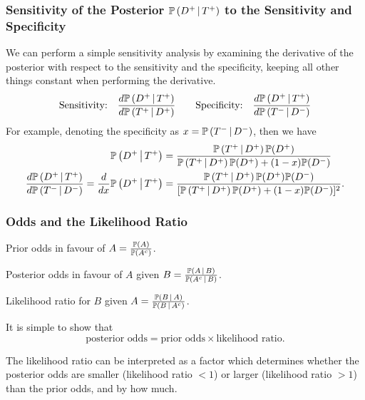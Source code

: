 \documentclass[10pt, a4paper]{article}
\begin{document}
\subsubsection{Sensitivity of the Posterior \texorpdfstring{$\P\left(D ^ {+} \mmid T ^ {+}\right)$}{} to the Sensitivity and Specificity}

We can perform a simple sensitivity analysis by examining the derivative of the posterior with respect to the sensitivity and the specificity,
keeping all other things constant when performing the derivative.
\[
\text{Sensitivity:}\quad\frac{d\P\left(D ^ {+} \mmid T ^ {+}\right)}{d\P\left(T ^ {+} \mmid D ^ {+}\right)}\qquad\text{Specificity:}\quad\frac{d\P\left(D ^ {+} \mmid T ^ {+}\right)}{d\P\left(T ^ {-} \mmid D ^ {-}\right)}
\]
For example,
denoting the specificity as $x = \P\left(T ^ {-} \mmid D ^ {-}\right)$,
then we have
\begin{align*}
    \P\left(D ^ {+} \mmid T ^ {+}\right) &= \frac{\cP{T ^ {+}}{D ^ {+}}\P(D ^ {+})}{\cP{T ^ {+}}{D ^ {+}}\P(D ^ {+}) + (1 - x)\P(D ^ {-})} \\
    \frac{d\P\left(D ^ {+} \mmid T ^ {+}\right)}{d\P\left(T ^ {-} \mmid D ^ {-}\right)} = \frac{d}{dx}\cP{D ^ {+}}{T ^ {+}} &= \frac{\cP{T ^ {+}}{D ^ {+}}\P(D ^ {+})\P(D ^ {-})}{[\cP{T ^ {+}}{D ^ {+}}\P(D ^ {+}) + (1 - x)\P(D ^ {-})] ^ 2}.
\end{align*}

\subsubsection{Odds and the Likelihood Ratio}
\begin{definition}
    Prior odds in favour of $A = \frac{\P(A)}{\P(A ^ c)}$.

    Posterior odds in favour of $A$ given $B = \frac{\cP{A}{B}}{\cP{A ^ c}{B}}$.

    Likelihood ratio for $B$ given $A = \frac{\cP{B}{A}}{\cP{B}{A ^ c}}$.

    It is simple to show that
    \[
    \text{posterior odds} = \text{prior odds} \times \text{likelihood ratio}.
    \]
\end{definition}

The likelihood ratio can be interpreted as a factor which determines whether the posterior odds are smaller
(likelihood ratio $< 1$)
or larger
(likelihood ratio $> 1$)
than the prior odds,
and by how much.

\newpage
\end{document}
